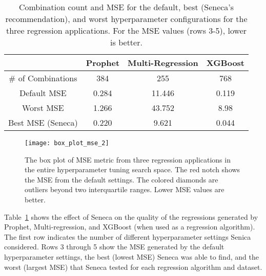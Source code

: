 \begin{table}
\centering
\begin{tabular}{|c|c|c|c|}
\hline
& Prophet & Multi-Regression & XGBoost\\
\hline
\# of Combinations & 384 & 255 & 768\\
\hline
\hline
Default MSE & 0.284 & 11.446 & 0.119 \\
\hline
Worst MSE & 1.266 & 43.752 & 8.98 \\
\hline
Best MSE (Seneca) & 0.220 & 9.621 & 0.044 \\
\hline
\end{tabular}
\caption{Combination count and MSE for the default, best (Seneca's recommendation), and worst hyperparameter configurations for the three regression applications. 
For the MSE  values (rows 3-5), lower is better.
\label{tab:mse}}
\vspace{-0.2in}
\end{table}

\begin{figure}[t] \centering 
\vspace{-0.2in}
\texttt{[image: box\_plot\_mse\_2]}
\vspace{-0.4in}
\caption{The box plot of MSE metric from three regression applications in the entire hyperparameter tuning search space. The red notch shows the MSE from the default settings. The colored diamonds are outliers beyond two interquartile ranges. Lower MSE values are better.
\label{fig:box_plot_mse}}
\vspace{-0.2in}
\end{figure}

Table~\ref{tab:mse} shows the effect of Seneca on the quality of the
regressions generated by Prophet, Multi-regression, and XGBoost (when used as
a regression algorithm). The first row indicates the number of
different hyperparameter settings Senica considered.  Rows 3 through 5 show
the MSE generated by the default hyperparameter settings, the best (lowest
MSE) Seneca was able to find, and the worst (largest MSE) that Seneca tested
for each regression algorithm and dataset.

%

